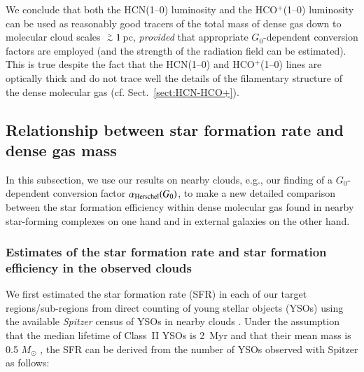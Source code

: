 \documentclass{aa}
\def\gtsima{$\; \buildrel > \over \sim \;$}
\def\simgt{\lower.5ex\hbox{\gtsima}}
\begin{document}
{We conclude that both the HCN(1--0) luminosity and the HCO$^{+}$(1--0) luminosity can be used as reasonably good tracers 
of the total mass of dense gas down to molecular cloud scales $\simgt 1\,$pc, 
{\it provided} that appropriate $G_0$-dependent conversion factors are employed (and the strength of the radiation field can be estimated). 
This is true despite the fact that the HCN(1--0) and HCO$^{+}$(1--0) lines are optically thick and do not trace well the details 
of the filamentary structure of the dense molecular gas (cf. Sect.~\ref{sect:HCN-HCO+}). 






\subsection{Relationship between star formation rate and dense gas mass} \label{SFR-Mdense}



In this subsection, we use our results on nearby clouds, e.g., our finding of a $G_0$-dependent conversion factor $\alpha_{\rm Herschel}(G_0)$,  
to make a new detailed comparison between the star formation efficiency within dense molecular gas 
found in nearby star-forming complexes on one hand and in external galaxies on the other hand.



\subsubsection{Estimates of the star formation rate and star formation efficiency in the observed clouds} \label{estimateSFR}



We first estimated the star formation rate (SFR) in each of our target regions/sub-regions 
from direct counting of young stellar objects (YSOs) using  
the available {\it Spitzer} census of YSOs in nearby clouds \citep{Evans09}. 
Under the assumption that the median lifetime of Class~II YSOs is 2~Myr \citep{Evans09, Covey10, Lada10,Dunham15} 
and that their {mean} mass is 0.5 $M_{\odot}$ \citep{Muench07}, 
the SFR can be derived from the number of YSOs observed with Spitzer as follows:

}
\end{document}
